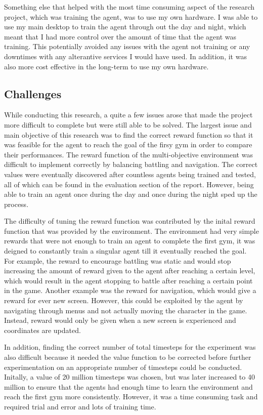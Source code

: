 Something else that helped with the most time consuming aspect of the research project, which was training the agent, was to use my own hardware. I was able to use my main desktop to train the agent through out the day and night, which meant that I had more control over the amount of time that the agent was training. This potentially avoided any issues with the agent not training or any downtimes with any alterantive services I would have used. In addition, it was also more cost effective in the long-term to use my own hardware.

\subsection{Challenges}

While conducting this research, a quite a few issues arose that made the project more difficult to complete but were still able to be solved. The largest issue and main objective of this research was to find the correct reward function so that it was feasible for the agent to reach the goal of the firsy gym in order to compare their performances. The reward function of the multi-objective environment was difficult to implement correctly by balancing battling and navigation. The correct values were eventually discovered after countless agents being trained and tested, all of which can be found in the evaluation section of the report. However, being able to train an agent once during the day and once during the night sped up the process. 

The difficulty of tuning the reward function was contributed by the inital reward function that was provided by the environment. The environment had very simple rewards that were not enough to train an agent to complete the first gym, it was deigned to constantly train a singular agent till it eventually reached the goal. For example, the reward to encourage battling was static and would stop increasing the amount of reward given to the agent after reaching a certain level, which would result in the agent stopping to battle after reaching a certain point in the game. Another example was the reward for navigation, which would give a reward for ever new screen. However, this could be exploited by the agent by navigating through menus and not actually moving the character in the game. Instead, reward would only be given when a new screen is experienced and coordinates are updated. 

In addition, finding the correct number of total timesteps for the experiment was also difficult because it needed the value function to be corrected before further experimentation on an appropriate number of timesteps could be conducted. Initally, a value of 20 million timesteps was chosen, but was later increased to 40 million to ensure that the agents had enough time to learn the environment and reach the first gym more consistently. However, it was a time consuming task and required trial and error and lots of training time.

